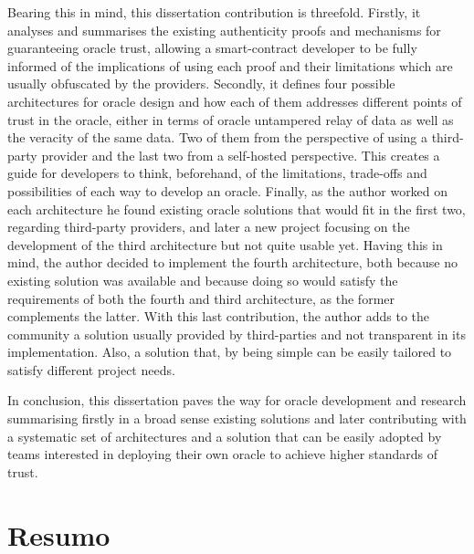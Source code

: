 

Bearing this in mind, this dissertation contribution is threefold. Firstly, it analyses and summarises the existing authenticity proofs and mechanisms for guaranteeing oracle trust, allowing a smart-contract developer to be fully informed of the implications of using each proof and their limitations which are usually obfuscated by the providers. Secondly, it defines four possible architectures for oracle design and how each of them addresses different points of trust in the oracle, either in terms of oracle untampered relay of data as well as the veracity of the same data. Two of them from the perspective of using a third-party provider and the last two from a self-hosted perspective. This creates a guide for developers to think, beforehand, of the limitations, trade-offs and possibilities of each way to develop an oracle. Finally, as the author worked on each architecture he found existing oracle solutions that would fit in the first two, regarding third-party providers, and later a new project focusing on the development of the third architecture but not quite usable yet. Having this in mind, the author decided to implement the fourth architecture, both because no existing solution was available and because doing so would satisfy the requirements of both the fourth and third architecture, as the former complements the latter. With this last contribution, the author adds to the community a solution usually provided by third-parties and not transparent in its implementation. Also, a solution that, by being simple can be easily tailored to satisfy different project needs.

In conclusion, this dissertation paves the way for oracle development and research summarising firstly in a broad sense existing solutions and later contributing with a systematic set of architectures and a solution that can be easily adopted by teams interested in deploying their own oracle to achieve higher standards of trust.


\chapter*{Resumo}



